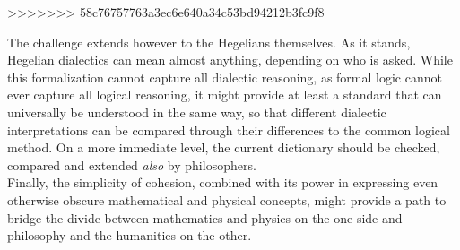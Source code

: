 \documentclass{article}
\begin{document}
>>>>>>> 58c76757763a3ec6e640a34c53bd94212b3fc9f8

The challenge extends however to the Hegelians themselves. As it stands, Hegelian dialectics can mean
almost anything, depending on who is asked. While this formalization cannot capture all dialectic reasoning,
as formal logic cannot ever capture all logical reasoning, it might provide at least a standard that can
universally be understood in the same way, so that different dialectic interpretations can be compared
through their differences to the common logical method. On a more immediate level, the current dictionary
should be checked, compared and extended \emph{also} by philosophers. \\

Finally, the simplicity of cohesion, combined with its power in expressing even otherwise obscure mathematical
and physical concepts, might provide a path to bridge the divide between mathematics and physics on the
one side and philosophy and the humanities on the other.







\printbibliography[
heading=bibintoc,
title={References}
]
\end{document}

